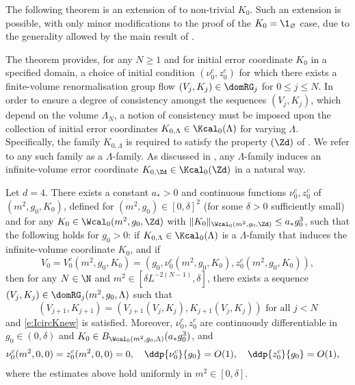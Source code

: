 The following theorem is an extension of \cite[Proposition~\ref{log-prop:flow-flow}]{BBS-saw4-log}
to non-trivial $K_0$. Such an extension is possible,
with only minor modifications to the proof of the $K_0 = \1_\varnothing$ case,
due to the generality allowed by the main result of \cite{BBS-rg-flow}.

The theorem provides, for any $N \ge 1$ and for initial error coordinate $K_0$
in a specified domain, a choice of initial condition $(\nu_0^c,z_0^c)$
for which there exists
a finite-volume renormalisation group flow $(V_j, K_j) \in \domRG_j$ for $0 \le j \le N$.
In order to ensure a degree of consistency amongst the sequences $(V_j, K_j)$, which depend on
the volume $\Lambda_N$, a notion of consistency must be imposed upon the collection of initial
error coordinates $K_{0,\Lambda} \in \Kcal_0(\Lambda)$ for varying $\Lambda$.
Specifically, the family $K_{0,\Lambda}$ is required to satisfy the property $(\Zd)$ of
\cite[Definition~\ref{step-defn:KZd}]{BS-rg-step}.
We refer to any such family as a $\Lambda$-family.
As discussed in \cite[Definition~\ref{step-defn:KZd}]{BS-rg-step},
any $\Lambda$-family
induces an infinite-volume error coordinate $K_{0,\Zd} \in \Kcal_0(\Zd)$ in a natural way.

\begin{theorem}
\label{thm:flow-flow}
Let $d = 4$.
There exists a constant $a_* > 0$ and continuous functions $\nu_0^c, z_0^c$
of $(m^2, g_0, K_0)$, defined for $(m^2, g_0) \in [0, \delta]^2$
(for some $\delta > 0$ sufficiently small) and for any $K_0 \in \Wcal_0(m^2, g_0, \Zd)$
with $\|K_0\|_{\Wcal_0(m^2, g_0, \Zd)} \leq a_* g_0^3$, such that
the following holds for $g_0 > 0$:
if $K_{0,\Lambda} \in \Kcal_0(\Lambda)$ is a $\Lambda$-family
that induces the infinite-volume coordinate $K_0$, and if
\begin{equation}
\label{e:flow-flow-ic}
V_0 = V_0^c(m^2, g_0, K_0) = (g_0, \nu_0^c(m^2,g_0,K_0), z_0^c(m^2,g_0,K_0)),
\end{equation}
then for any $N \in \N$ and $m^2 \in [\delta L^{-2 (N - 1)}, \delta]$,
there exists a sequence $(V_j, K_j) \in \domRG_j(m^2, g_0, \Lambda)$
such that
\begin{equation}
  \label{e:VjKjDj}
  (V_{j+1},K_{j+1}) = (V_{j+1}(V_j, K_j), K_{j+1}(V_j, K_j)) \text{ for all } j < N
\end{equation}
and \eqref{e:IcircKnew} is satisfied.
Moreover, $\nu_0^c,z_0^c$ are continuously differentiable in
$g_0 \in (0, \delta)$ and $K_0 \in B_{\Wcal_0(m^2, g_0, \Lambda)}(a_* g_0^3)$, and
\begin{align}
&\nu_0^c(m^2,0,0) = z_0^c(m^2,0,0) = 0,
\quad
\ddp{\nu_0^c}{g_0} = O(1),
\quad
\label{e:z0est}
\ddp{z_0^c}{g_0} = O(1),
\end{align}
where the estimates above hold uniformly in $m^2 \in [0, \delta]$.
\end{theorem}

